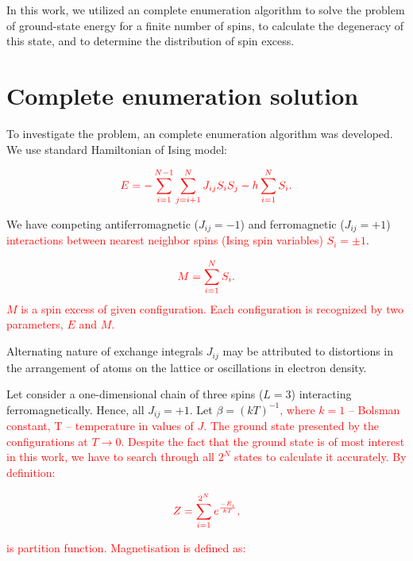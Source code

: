 \documentclass[preprint,12pt]{elsarticle}
\begin{document}
	In this work, we utilized an complete enumeration algorithm \cite{dias2023ground, padalko2021parallel} to solve the problem of ground-state energy for a finite number of spins, to calculate the degeneracy of this state, and to determine the distribution of spin excess.
	
	\section{Complete enumeration solution}
	
	To investigate the problem, an complete enumeration algorithm was developed. We use standard Hamiltonian of Ising model:
	
	\begin{equation}
		\color{red}
		E = -\sum^{N - 1}_{i=1}\sum^N_{j = i + 1} J_{ij} S_i S_j - h \sum^N_{i=1} S_i.
		\label{eq:ising_energy}
	\end{equation}
	
	We have competing antiferromagnetic ($J_{ij} = -1$) and ferromagnetic ($J_{ij} = +1$) \textcolor{red}{interactions between nearest neighbor spins (Ising spin variables) $S_i = \pm1$}. 
	
	\begin{equation}
		\color{red}
		M = \sum^N_{i=1} S_i.
		\label{eq:spin_excess} 
	\end{equation}
	\textcolor{red}{$M$ is a spin excess of given configuration. Each configuration is recognized by two parameters, $E$ and $M$.}
	
	
	Alternating nature of exchange integrals $J_{ij}$ may be attributed to distortions in the arrangement of atoms on the lattice or oscillations in electron density.
	
	Let consider a one-dimensional chain of three spins ($L = 3$) interacting ferromagnetically. Hence, all $J_{ij} = +1$. Let $\beta = (kT)^{-1}$\textcolor{red}{, where $k = 1$ -- Bolsman constant, T -- temperature in values of $J$. The ground state presented by the configurations at $T \rightarrow 0$. Despite the fact that the ground state is of most interest in this work, we have to search through all $2^N$ states to calculate it accurately. By definition:}
	
	\begin{equation}
		\color{red}
		Z = \sum_{i = 1}^{2 ^ N} e^{\frac{-E_i}{kT}},
		\label{eq:stat_difinition}
	\end{equation}
	
	\noindent \textcolor{red}{is partition function. Magnetisation is defined as:} 
	
\end{document}
